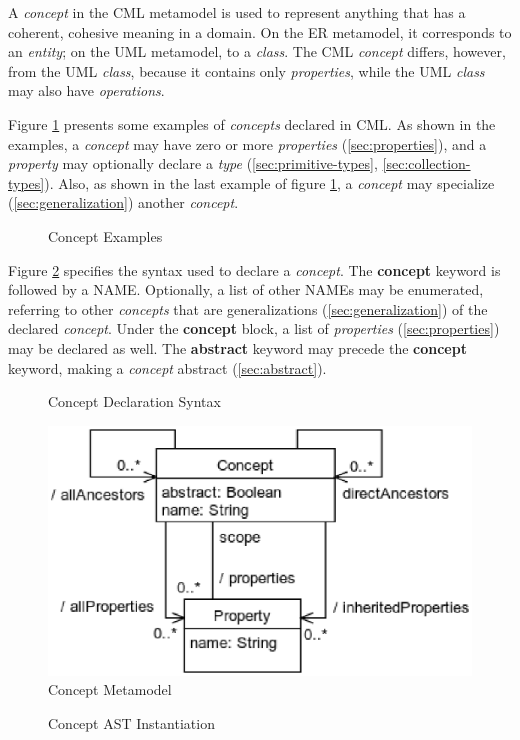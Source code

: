 A \emph{concept} in the CML metamodel is used to represent anything
that has a coherent, cohesive meaning in a domain.
On the ER \cite{er} metamodel,
it corresponds to an \emph{entity};
on the UML \cite{uml} metamodel,
to a \emph{class}.
The CML \emph{concept} differs, however, from the UML \emph{class},
because it contains only \emph{properties},
while the UML \emph{class} may also have \emph{operations}.

Figure \ref{fig:ex:concepts} presents some examples of \emph{concepts} declared in CML.
As shown in the examples,
a \emph{concept} may have zero or more \emph{properties}
(\ref{sec:properties}),
and a \emph{property} may optionally declare a \emph{type}
(\ref{sec:primitive-types}, \ref{sec:collection-types}).
Also, as shown in the last example of figure \ref{fig:ex:concepts},
a \emph{concept} may specialize
(\ref{sec:generalization})
another \emph{concept}.

\begin{figure}
\verbatimfont{\small}
\begin{framed}

\end{framed}
\caption{Concept Examples}
\label{fig:ex:concepts}
\end{figure}

Figure \ref{fig:stx:concept} specifies the syntax used
to declare a \emph{concept}.
The \textbf{concept} keyword is followed by a NAME.
Optionally, a list of other NAMEs may be enumerated,
referring to other \emph{concepts}
that are generalizations (\ref{sec:generalization}) of the declared \emph{concept}.
Under the \textbf{concept} block,
a list of \emph{properties} (\ref{sec:properties}) may be declared as well.
The \textbf{abstract} keyword may precede the \textbf{concept} keyword, making a \emph{concept} abstract (\ref{sec:abstract}).

\begin{figure}
\verbatimfont{\small}
\begin{framed}

\end{framed}
\caption{Concept Declaration Syntax}
\label{fig:stx:concept}
\end{figure}

\begin{figure}
\includegraphics[width=\textwidth]{metamodel/concept}
\caption{Concept Metamodel}
\label{fig:meta:concept}
\end{figure}

\begin{figure}
\verbatimfont{\small}
\begin{framed}

\end{framed}
\caption{Concept AST Instantiation}
\label{fig:ast:concept}
\end{figure}
